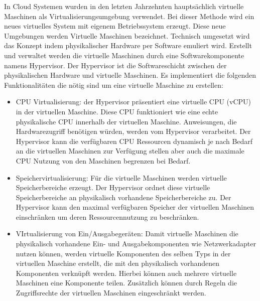 In Cloud Systemen wurden in den letzten Jahrzehnten hauptsächlich virtuelle Maschinen als Virtualisierungsumgebung verwendet. Bei dieser Methode wird ein neues virtuelles System mit eigenem Betriebssystem erzeugt. Diese neue Umgebungen werden Virtuelle Maschinen bezeichnet. \cite{Pahl2015} Technisch umgesetzt wird das Konzept indem physikalischer Hardware per Software emuliert wird. Erstellt und verwaltet werden die virtuelle Maschinen durch eine Softwarekomponente namens Hypervisor. Der Hypervisor ist die Softwareschicht zwischen der physikalischen Hardware und virtuelle Maschinen. Es implementiert die folgenden Funktionalitäten die nötig sind um eine virtuelle Maschine zu erstellen:
\begin{itemize}
	\item CPU Virtualisierung: der Hypervisor präsentiert eine virtuelle CPU (vCPU) in der virtuellen Maschine. Diese CPU funktioniert wie eine echte physikalische CPU innerhalb der virtuellen Maschine. Anweisungen, die Hardwarezugriff benötigen würden, werden vom Hypervisor verarbeitet. Der Hypervisor kann die verfügbaren CPU Ressourcen dynamisch je nach Bedarf an die virtuellen Maschinen zur Verfügung stellen aber auch die maximale CPU Nutzung von den Maschinen begrenzen bei Bedarf. 
	\item Speichervirtualisierung: Für die virtuelle Maschinen werden virtuelle Speicherbereiche erzeugt. Der Hypervisor ordnet diese virtuelle Speicherbereiche an physikalisch vorhandene Speicherbereiche zu. Der Hypervisor kann den maximal verfügbaren Speicher der virtuellen Maschinen einschränken um deren Ressourcennutzung zu beschränken.
	\item VIrtualisierung von Ein/Ausgabegeräten: Damit virtuelle Maschinen die physikalisch vorhandene Ein- und Ausgabekomponenten wie Netzwerkadapter nutzen können, werden virtuelle Komponenten des selben Typs in der virtuellen Maschine erstellt, die mit den physikalisch vorhandenen Komponenten verknüpft werden. Hierbei können auch mehrere virtuelle Maschinen eine Komponente teilen. Zusätzlich können durch Regeln die Zugriffsrechte der virtuellen Maschinen eingeschränkt werden.  \cite{Dall2014}
\end{itemize}
